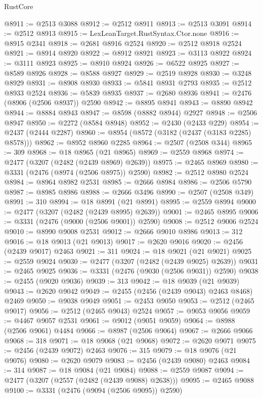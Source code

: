 \begin{lexlean}{RustCore}
\begin{coremodule}
@8911 := @2513 @3088
@8912 := @2512 @8911
@8913 := @2513 @3091
@8914 := @2512 @8913
@8915 := LexLeanTarget.RustSyntax.Ctor.none
@8916 := @8915 @2341
@8918 := @2681 @8916 @2524
@8920 := @2512 @8918 @2524
@8921 := @8914 @8920
@8922 := @8912 @8921
@8923 := @3113 @8922
@8924 := @3111 @8923
@8925 := @8910 @8924
@8926 := @6522 @8925
@8927 := @8589 @8926
@8928 := @8588 @8927
@8929 := @2519 @8928
@8930 := @3248 @8929
@8931 := @8908 @8930
@8933 := @5841 @8931 @2793
@8935 := @2512 @8933 @2524
@8936 := @5839 @8935
@8937 := @2680 @8936
@8941 := @2476 (@8906 (@2506 @8937)) @2590
@8942 := @8895 @8941
@8943 := @8890 @8942
@8944 := @8884 @8943
@8947 := @8598 (@8882 @8944) @2927
@8948 := @2506 @8947
@8950 := @2272 (@8584 @8948)
@8952 := @2430 (@2433 @229)
@8954 := @2437 (@2444 @2287)
@8960 := @8954 (@8572 (@3182 (@2437 (@3183 @2285) @8578)))
@8962 := @8952 @8960 @2285
@8964 := @2507 (@2508 @344)
@8965 := 309
@8968 := @18 @8965 (@21 @8965)
@8969 := @2559 @8968
@8974 := @2477 (@3207 (@2482 (@2439 @8969) @2639))
@8975 := @2465 @8969
@8980 := @3331 (@2476 (@8974 (@2506 @8975)) @2590)
@8982 := @2512 @8980 @2524
@8984 := @8964 @8982 @2531
@8985 := @2666 @8984
@8986 := @2506 @5790
@8987 := @8985 @8986
@8988 := @2666 @3496
@8990 := @2507 (@2508 @349)
@8991 := 310
@8994 := @18 @8991 (@21 @8991)
@8995 := @2559 @8994
@9000 := @2477 (@3207 (@2482 (@2439 @8995) @2639))
@9001 := @2465 @8995
@9006 := @3331 (@2476 (@9000 (@2506 @9001)) @2590)
@9008 := @2512 @9006 @2524
@9010 := @8990 @9008 @2531
@9012 := @2666 @9010 @8986
@9013 := 312
@9016 := @18 @9013 (@21 @9013)
@9017 := @2620 @9016
@9020 := @2456 (@2439 @9017) @2463
@9021 := 311
@9024 := @18 @9021 (@21 @9021)
@9025 := @2559 @9024
@9030 := @2477 (@3207 (@2482 (@2439 @9025) @2639))
@9031 := @2465 @9025
@9036 := @3331 (@2476 (@9030 (@2506 @9031)) @2590)
@9038 := @2455 (@9020 @9036)
@9039 := 313
@9042 := @18 @9039 (@21 @9039)
@9043 := @2620 @9042
@9049 := @2455 (@2456 (@2439 @9043) @2463 @8468) @2469
@9050 := @9038 @9049
@9051 := @2453 @9050
@9053 := @2512 (@2465 @9017)
@9056 := @2512 (@2465 @9043) @2524
@9057 := @9053 @9056
@9059 := @4467 @9057 @2531
@9061 := @9012 (@9051 @9059)
@9064 := @8988 (@2506 @9061) @4484
@9066 := @8987 (@2506 @9064)
@9067 := @2666 @9066
@9068 := 318
@9071 := @18 @9068 (@21 @9068)
@9072 := @2620 @9071
@9075 := @2456 (@2439 @9072) @2463
@9076 := 315
@9079 := @18 @9076 (@21 @9076)
@9080 := @2620 @9079
@9083 := @2456 (@2439 @9080) @2463
@9084 := 314
@9087 := @18 @9084 (@21 @9084)
@9088 := @2559 @9087
@9094 := @2477 (@3207 (@2557 (@2482 (@2439 @9088) @2638)))
@9095 := @2465 @9088
@9100 := @3331 (@2476 (@9094 (@2506 @9095)) @2590)

\end{coremodule}
\end{lexlean}
